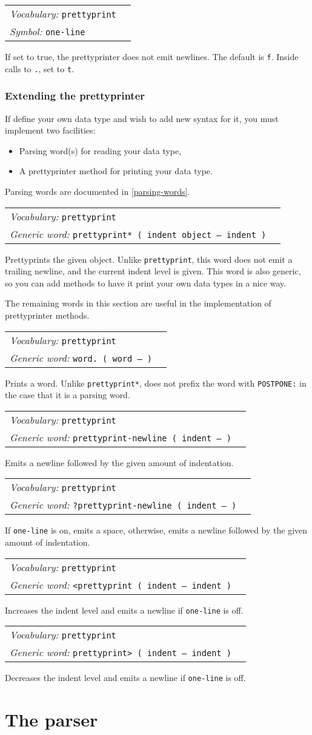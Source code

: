 \documentclass{book}
\newcommand{\vocabulary}[1]{\emph{Vocabulary:} \texttt{#1}&\\}
\newcommand{\symbolword}[1]{\index{\texttt{#1}}\emph{Symbol:} \texttt{#1}&\\}
\newcommand{\genericword}[2]{\index{\texttt{#1}}\emph{Generic word:} \texttt{#2}&\\}
\newcommand{\wordtable}[1]{


\begin{tabularx}{12cm}{lX}
\hline
#1
\hline
\end{tabularx}

}
\begin{document}
\wordtable{
\vocabulary{prettyprint}
\symbolword{one-line}
}
If set to true, the prettyprinter does not emit newlines. The default is \texttt{f}. Inside calls to \texttt{.}, set to \texttt{t}.

\subsubsection{Extending the prettyprinter}

If define your own data type and wish to add new syntax for it, you must implement two facilities:
\begin{itemize}
\item Parsing word(s) for reading your data type,
\item A prettyprinter method for printing your data type.
\end{itemize}
Parsing words are documented in \ref{parsing-words}.

\wordtable{
\vocabulary{prettyprint}
\genericword{prettyprint*}{prettyprint* ( indent object -- indent )}
}
Prettyprints the given object. Unlike \texttt{prettyprint}, this word does not emit a trailing newline, and the current indent level is given. This word is also generic, so you can add methods to have it print your own data types in a nice way.

The remaining words in this section are useful in the implementation of prettyprinter methods.
\wordtable{
\vocabulary{prettyprint}
\genericword{word.}{word.~( word -- )}
}
Prints a word. Unlike \texttt{prettyprint*}, does not prefix the word with \texttt{POSTPONE:} in the case that it is a parsing word.
\wordtable{
\vocabulary{prettyprint}
\genericword{prettyprint-newline}{prettyprint-newline ( indent -- )}
}
Emits a newline followed by the given amount of indentation.
\wordtable{
\vocabulary{prettyprint}
\genericword{?prettyprint-newline}{?prettyprint-newline ( indent -- )}
}
If \texttt{one-line} is on, emits a space, otherwise, emits a newline followed by the given amount of indentation.
\wordtable{
\vocabulary{prettyprint}
\genericword{<prettyprint}{<prettyprint~( indent -- indent )}
}
Increases the indent level and emits a newline if \texttt{one-line} is off.
\wordtable{
\vocabulary{prettyprint}
\genericword{prettyprint>}{prettyprint>~( indent -- indent )}
}
Decreases the indent level and emits a newline if \texttt{one-line} is off.

\section{The parser}
\end{document}
